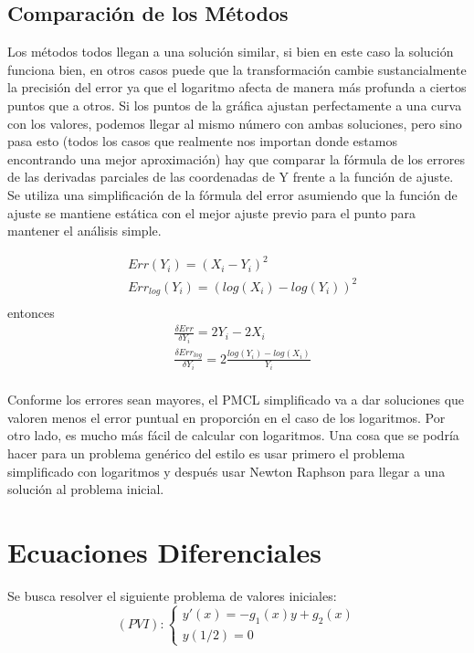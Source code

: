\documentclass{endm}
\begin{document}
\subsection{Comparación de los Métodos}
Los métodos todos llegan a una solución similar, si bien en este caso la solución funciona bien, en otros casos puede que la transformación cambie sustancialmente la precisión del error ya que el logaritmo afecta de manera más profunda a ciertos puntos que a otros. Si los puntos de la gráfica ajustan perfectamente a una curva con los valores, podemos llegar al mismo número con ambas soluciones, pero sino pasa esto (todos los casos que realmente nos importan donde estamos encontrando una mejor aproximación) hay que comparar la fórmula de los errores de las derivadas parciales de las coordenadas de Y frente a la función de ajuste. Se utiliza una simplificación de la fórmula del error asumiendo que la función de ajuste se mantiene estática con el mejor ajuste previo para el punto para mantener el análisis simple.

\begin{align*}
&Err(Y_i)= (X_i-Y_i)^2\\
&Err_{log}(Y_i)= (log(X_i)-log(Y_i))^2\\
\end{align*}
entonces
\begin{align*}
&\frac{\delta Err}{\delta Y_i} = 2Y_i - 2X_i\\
&\frac{\delta Err_{log}}{\delta Y_i} = 2\frac{log(Y_i)-log(X_i)}{Y_i}\\
\end{align*}

Conforme los errores sean mayores, el PMCL simplificado va a dar soluciones que valoren menos el error puntual en proporción en el caso de los logaritmos. Por otro lado, es mucho más fácil de calcular con logaritmos. Una cosa que se podría hacer para un problema genérico del estilo es usar primero el problema simplificado con logaritmos y después usar Newton Raphson para llegar a una solución al problema inicial.

\section{Ecuaciones Diferenciales}
Se busca resolver el siguiente problema de valores iniciales:
\begin{equation*}
    (PVI):\begin{cases}
        y'(x) = -g_1(x)y + g_2(x) \\
        y(1/2) = 0
    \end{cases}
\end{equation*}
\end{document}
